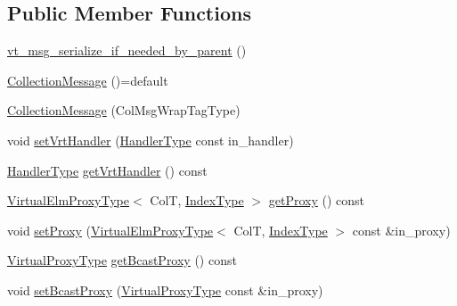 \subsection*{Public Member Functions}
\begin{DoxyCompactItemize}
\item 
\hyperlink{structvt_1_1vrt_1_1collection_1_1_collection_message_a0fc711471f331ab5db164449977abd40}{vt\+\_\+msg\+\_\+serialize\+\_\+if\+\_\+needed\+\_\+by\+\_\+parent} ()
\item 
\hyperlink{structvt_1_1vrt_1_1collection_1_1_collection_message_a67157cfe91f1138728cf8c4ea14a0778}{Collection\+Message} ()=default
\item 
\hyperlink{structvt_1_1vrt_1_1collection_1_1_collection_message_a8012bc5471893e2daedeab8aa4ed1509}{Collection\+Message} (Col\+Msg\+Wrap\+Tag\+Type)
\item 
void \hyperlink{structvt_1_1vrt_1_1collection_1_1_collection_message_af445908abd188d29962e794f28e40f3f}{set\+Vrt\+Handler} (\hyperlink{namespacevt_af64846b57dfcaf104da3ef6967917573}{Handler\+Type} const in\+\_\+handler)
\item 
\hyperlink{namespacevt_af64846b57dfcaf104da3ef6967917573}{Handler\+Type} \hyperlink{structvt_1_1vrt_1_1collection_1_1_collection_message_aa5966355f4fe5f9ac7dc965a7f6e4de4}{get\+Vrt\+Handler} () const
\item 
\hyperlink{namespacevt_1_1vrt_a620a5c8c59d13e513f690c74b4af516f}{Virtual\+Elm\+Proxy\+Type}$<$ ColT, \hyperlink{structvt_1_1vrt_1_1collection_1_1_collection_message_a324978c38e67d1bfa86c8db172e77594}{Index\+Type} $>$ \hyperlink{structvt_1_1vrt_1_1collection_1_1_collection_message_a195386067f31cffdecbce5f05bfba5f2}{get\+Proxy} () const
\item 
void \hyperlink{structvt_1_1vrt_1_1collection_1_1_collection_message_a38349a148d8dbcab2a4a54efa2089e1c}{set\+Proxy} (\hyperlink{namespacevt_1_1vrt_a620a5c8c59d13e513f690c74b4af516f}{Virtual\+Elm\+Proxy\+Type}$<$ ColT, \hyperlink{structvt_1_1vrt_1_1collection_1_1_collection_message_a324978c38e67d1bfa86c8db172e77594}{Index\+Type} $>$ const \&in\+\_\+proxy)
\item 
\hyperlink{namespacevt_a1b417dd5d684f045bb58a0ede70045ac}{Virtual\+Proxy\+Type} \hyperlink{structvt_1_1vrt_1_1collection_1_1_collection_message_a25c1d0924ade6a7e074fc419a75c8a71}{get\+Bcast\+Proxy} () const
\item 
void \hyperlink{structvt_1_1vrt_1_1collection_1_1_collection_message_a0f4be7193beb77e9862417a5eb6cff5a}{set\+Bcast\+Proxy} (\hyperlink{namespacevt_a1b417dd5d684f045bb58a0ede70045ac}{Virtual\+Proxy\+Type} const \&in\+\_\+proxy)

\end{DoxyCompactItemize}
